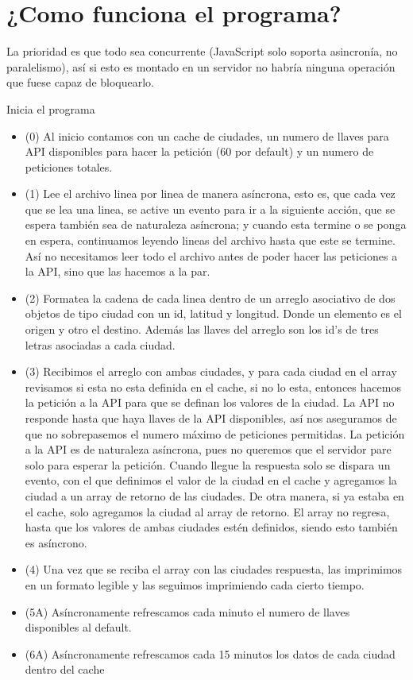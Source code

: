 \documentclass{article}
\begin{document}
\section{¿Como funciona el programa?}
La prioridad es que todo sea concurrente (JavaScript solo soporta asincronía, no paralelismo), así si esto es montado en un servidor no habría ninguna operación que fuese capaz de bloquearlo.

    Inicia el programa
    \begin{itemize}
        \item (0) Al inicio contamos con un cache de ciudades, un numero de llaves para API disponibles para hacer la petición (60 por default) y un numero de peticiones totales.

        \item (1) Lee el archivo linea por linea de manera asíncrona, esto es, que cada vez que se lea una linea, se active un evento para ir a la siguiente acción, que se espera también sea de naturaleza asíncrona; y cuando esta termine o se ponga en espera, continuamos leyendo lineas del archivo hasta que este se termine. Así no necesitamos leer todo el archivo antes de poder hacer las peticiones a la API, sino que las hacemos a la par.

        \item (2) Formatea la cadena de cada linea dentro de un arreglo asociativo de dos objetos de tipo ciudad con un id, latitud y longitud. Donde un elemento es el origen y otro el destino. Además las llaves del arreglo son los id's de tres letras asociadas a cada ciudad.

        \item (3) Recibimos el arreglo con ambas ciudades, y para cada ciudad en el array revisamos si esta no esta definida en el cache, si no lo esta, entonces hacemos la petición a la API para que se definan los valores de la ciudad. La API no responde hasta que haya llaves de la API disponibles, así nos aseguramos de que no sobrepasemos el numero máximo de peticiones permitidas. La petición a la API es de naturaleza asíncrona, pues no queremos que el servidor pare solo para esperar la petición. Cuando llegue la respuesta solo se dispara un evento, con el que definimos el valor de la ciudad en el cache y agregamos la ciudad a un array de retorno de las ciudades.
        De otra manera, si ya estaba en el cache, solo agregamos la ciudad al array de retorno. El array no regresa, hasta que los valores de ambas ciudades estén definidos, siendo esto también es asíncrono.

        \item (4) Una vez que se reciba el array con las ciudades respuesta, las imprimimos en un formato legible y las seguimos imprimiendo cada cierto tiempo.

        \item (5A) Asíncronamente refrescamos cada minuto el numero de llaves disponibles al default.

        \item (6A) Asíncronamente refrescamos cada 15 minutos los datos de cada ciudad dentro del cache
    \end{itemize}
\end{document}
